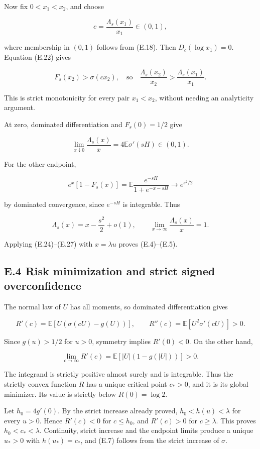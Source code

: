 \documentclass[
  11pt,
  a4paper,
]{article}
\begin{document}
Now fix \(0<x_1<x_2\), and choose

\[
c=\frac{\Lambda_s(x_1)}{x_1}\in(0,1),
\tag{E.23}
\]

where membership in \((0,1)\) follows from (E.18). Then
\(D_c(\log x_1)=0\). Equation (E.22) gives

\[
F_s(x_2)>\sigma(cx_2),\quad\text{so}\quad
\frac{\Lambda_s(x_2)}{x_2}>
\frac{\Lambda_s(x_1)}{x_1}.
\tag{E.24}
\]

This is strict monotonicity for every pair \(x_1<x_2\), without needing
an analyticity argument.

At zero, dominated differentiation and \(F_s(0)=1/2\) give

\[
\lim_{x\downarrow0}\frac{\Lambda_s(x)}x
=4\mathbb E\sigma'(sH)\in(0,1).
\tag{E.25}
\]

For the other endpoint,

\[
e^x[1-F_s(x)]
=\mathbb E\frac{e^{-sH}}{1+e^{-x-sH}}
\longrightarrow e^{s^2/2}
\tag{E.26}
\]

by dominated convergence, since \(e^{-sH}\) is integrable. Thus

\[
\Lambda_s(x)=x-\frac{s^2}2+o(1),\qquad
\lim_{x\to\infty}\frac{\Lambda_s(x)}x=1.
\tag{E.27}
\]

Applying (E.24)--(E.27) with \(x=\lambda u\) proves (E.4)--(E.5).

\hypertarget{e.4-risk-minimization-and-strict-signed-overconfidence}{%
\subsection{E.4 Risk minimization and strict signed
overconfidence}\label{e.4-risk-minimization-and-strict-signed-overconfidence}}

The normal law of \(U\) has all moments, so dominated differentiation
gives

\[
R'(c)=\mathbb E[U(\sigma(cU)-g(U))],\qquad
R''(c)=\mathbb E[U^2\sigma'(cU)]>0.
\tag{E.28}
\]

Since \(g(u)>1/2\) for \(u>0\), symmetry implies \(R'(0)<0\). On the
other hand,

\[
\lim_{c\to\infty}R'(c)
=\mathbb E[|U|(1-g(|U|))]>0.
\tag{E.29}
\]

The integrand is strictly positive almost surely and is integrable. Thus
the strictly convex function \(R\) has a unique critical point
\(c_*>0\), and it is its global minimizer. Its value is strictly below
\(R(0)=\log2\).

Let \(h_0=4g'(0)\). By the strict increase already proved,
\(h_0<h(u)<\lambda\) for every \(u>0\). Hence \(R'(c)<0\) for
\(c\le h_0\), and \(R'(c)>0\) for \(c\ge\lambda\). This proves
\(h_0<c_*<\lambda\). Continuity, strict increase and the endpoint limits
produce a unique \(u_*>0\) with \(h(u_*)=c_*\), and (E.7) follows from
the strict increase of \(\sigma\).
\end{document}
